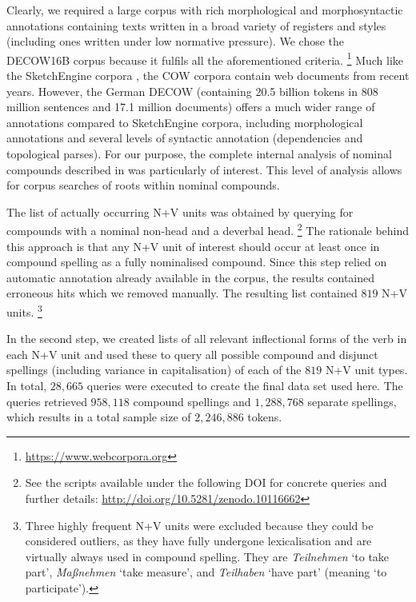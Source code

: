 \documentclass[biblatex, charis, linguex]{glossa}\usepackage{knitr}
\begin{document}
Clearly, we required a large corpus with rich morphological and morphosyntactic annotations containing texts written in a broad variety of registers and styles (including ones written under low normative pressure).
We chose the DECOW16B corpus \parencite{SchaeferBildhauer2012a} because it fulfils all the aforementioned criteria.%
\footnote{\url{https://www.webcorpora.org}}
Much like the SketchEngine corpora \parencite{KilgarriffEa2014}, the COW corpora contain web documents from recent years.
However, the German DECOW (containing 20.5 billion tokens in 808 million sentences and 17.1 million documents) offers a much wider range of annotations compared to SketchEngine corpora, including morphological annotations and several levels of syntactic annotation (dependencies and topological parses).
For our purpose, the complete internal analysis of nominal compounds described in \citet{SchaeferPankratz2018} was particularly of interest.
This level of analysis allows for corpus searches of roots within nominal compounds.

The list of actually occurring N+V units was obtained by querying for compounds with a nominal non-head and a deverbal head.%
\footnote{See the scripts available under the following DOI for concrete queries and further details: \url{http://doi.org/10.5281/zenodo.10116662}}
The rationale behind this approach is that any N+V unit of interest should occur at least once in compound spelling as a fully nominalised compound.
Since this step relied on automatic annotation already available in the corpus, the results contained erroneous hits which we removed manually.
The resulting list contained $819$ N+V units.%
\footnote{Three highly frequent N+V units were excluded because they could be considered outliers, as they have fully undergone lexicalisation and are virtually always used in compound spelling.
They are \textit{Teilnehmen} `to take part', \textit{Maßnehmen} `take measure', and \textit{Teilhaben} `have part' (meaning `to participate').}

In the second step, we created lists of all relevant inflectional forms of the verb in each N+V unit and used these to query all possible compound and disjunct spellings (including variance in capitalisation) of each of the $819$ N+V unit types.
In total, $28,665$ queries were executed to create the final data set used here.
The queries retrieved $958,118$ compound spellings and $1,288,768$ separate spellings, which results in a total sample size of $2,246,886$ tokens.
\end{document}
